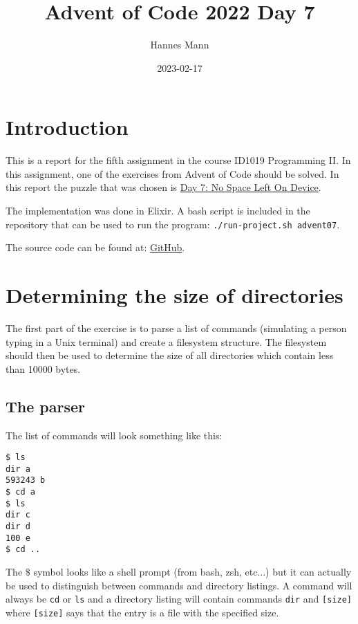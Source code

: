 \documentclass[a4paper,11pt]{article}
\begin{document}
\title{
    \textbf{Advent of Code 2022 Day 7}
}
\author{Hannes Mann}
\date{2023-02-17}

\maketitle

\section*{Introduction}

This is a report for the fifth assignment in the course ID1019 Programming II.
In this assignment, one of the exercises from Advent of Code should be solved. In this report the puzzle that was chosen is \href{https://adventofcode.com/2022/day/7}{Day 7: No Space Left On Device}.

The implementation was done in Elixir. A bash script is included in the repository that can be used to run the program: \texttt{./run-project.sh advent07}.

The source code can be found at: \href{https://github.com/hannesmann/ID1019/tree/main/src/advent07}{GitHub}.

\section*{Determining the size of directories}

The first part of the exercise is to parse a list of commands (simulating a person typing in a Unix terminal) and create a filesystem structure.
The filesystem should then be used to determine the size of all directories which contain less than 10000 bytes.

\subsection*{The parser}

The list of commands will look something like this:
\begin{verbatim}
$ ls
dir a
593243 b
$ cd a
$ ls
dir c
dir d
100 e
$ cd ..
\end{verbatim}

The $\$$ symbol looks like a shell prompt (from bash, zsh, etc...) but it can actually be used to distinguish between commands and directory listings.
A command will always be \texttt{cd} or \texttt{ls} and a directory listing will contain commands \texttt{dir} and \texttt{[size]}
where \texttt{[size]} says that the entry is a file with the specified size.
\end{document}
